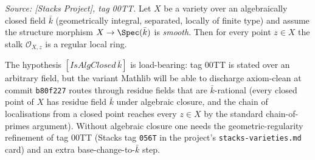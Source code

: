 \begin{lemma}
  \textit{Source: [Stacks Project], tag 00TT.}
  Let \(X\) be a variety over an algebraically closed field \(\bar k\) (geometrically
  integral, separated, locally of finite type) and assume the structure morphism
  \(X \to \Spec(\bar k)\) is \emph{smooth}. Then for every point \(z \in X\) the
  stalk \(\mathcal O_{X, z}\) is a regular local ring.

  The hypothesis \([IsAlgClosed\,\bar k]\) is load-bearing: tag 00TT is stated
  over an arbitrary field, but the variant Mathlib will be able to discharge
  axiom-clean at commit \texttt{b80f227} routes through residue fields that are
  \(\bar k\)-rational (every closed point of \(X\) has residue field \(\bar k\) under
  algebraic closure, and the chain of localisations from a closed point reaches
  every \(z \in X\) by the standard chain-of-primes argument). Without algebraic
  closure one needs the geometric-regularity refinement of tag 00TT (Stacks tag
  \texttt{056T} in the project's \texttt{stacks-varieties.md} card) and an extra
  base-change-to-\(\bar k\) step.
\end{lemma}

